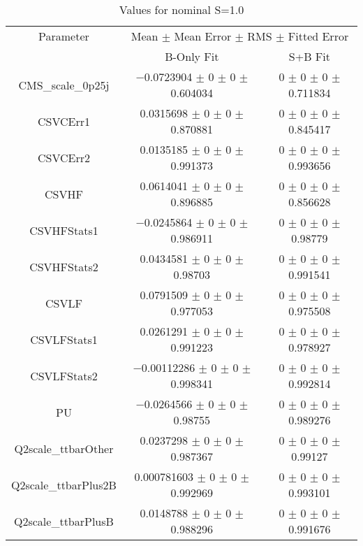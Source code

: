\begin{table}
\centering
\caption{Values for nominal S=1.0}
\begin{tabular}{ccc}
\toprule
Parameter & \multicolumn{2}{c}{Mean $\pm$ Mean Error $\pm$ RMS $\pm$ Fitted Error}\\
 & B-Only Fit & S+B Fit\\
\midrule
CMS\_scale\_0p25j & \num{-0.0723904} $\pm$ \num{0} $\pm$ \num{0} $\pm$ \num{0.604034} & \num{0} $\pm$ \num{0} $\pm$ \num{0} $\pm$ \num{0.711834}\\
CSVCErr1 & \num{0.0315698} $\pm$ \num{0} $\pm$ \num{0} $\pm$ \num{0.870881} & \num{0} $\pm$ \num{0} $\pm$ \num{0} $\pm$ \num{0.845417}\\
CSVCErr2 & \num{0.0135185} $\pm$ \num{0} $\pm$ \num{0} $\pm$ \num{0.991373} & \num{0} $\pm$ \num{0} $\pm$ \num{0} $\pm$ \num{0.993656}\\
CSVHF & \num{0.0614041} $\pm$ \num{0} $\pm$ \num{0} $\pm$ \num{0.896885} & \num{0} $\pm$ \num{0} $\pm$ \num{0} $\pm$ \num{0.856628}\\
CSVHFStats1 & \num{-0.0245864} $\pm$ \num{0} $\pm$ \num{0} $\pm$ \num{0.986911} & \num{0} $\pm$ \num{0} $\pm$ \num{0} $\pm$ \num{0.98779}\\
CSVHFStats2 & \num{0.0434581} $\pm$ \num{0} $\pm$ \num{0} $\pm$ \num{0.98703} & \num{0} $\pm$ \num{0} $\pm$ \num{0} $\pm$ \num{0.991541}\\
CSVLF & \num{0.0791509} $\pm$ \num{0} $\pm$ \num{0} $\pm$ \num{0.977053} & \num{0} $\pm$ \num{0} $\pm$ \num{0} $\pm$ \num{0.975508}\\
CSVLFStats1 & \num{0.0261291} $\pm$ \num{0} $\pm$ \num{0} $\pm$ \num{0.991223} & \num{0} $\pm$ \num{0} $\pm$ \num{0} $\pm$ \num{0.978927}\\
CSVLFStats2 & \num{-0.00112286} $\pm$ \num{0} $\pm$ \num{0} $\pm$ \num{0.998341} & \num{0} $\pm$ \num{0} $\pm$ \num{0} $\pm$ \num{0.992814}\\
PU & \num{-0.0264566} $\pm$ \num{0} $\pm$ \num{0} $\pm$ \num{0.98755} & \num{0} $\pm$ \num{0} $\pm$ \num{0} $\pm$ \num{0.989276}\\
Q2scale\_ttbarOther & \num{0.0237298} $\pm$ \num{0} $\pm$ \num{0} $\pm$ \num{0.987367} & \num{0} $\pm$ \num{0} $\pm$ \num{0} $\pm$ \num{0.99127}\\
Q2scale\_ttbarPlus2B & \num{0.000781603} $\pm$ \num{0} $\pm$ \num{0} $\pm$ \num{0.992969} & \num{0} $\pm$ \num{0} $\pm$ \num{0} $\pm$ \num{0.993101}\\
Q2scale\_ttbarPlusB & \num{0.0148788} $\pm$ \num{0} $\pm$ \num{0} $\pm$ \num{0.988296} & \num{0} $\pm$ \num{0} $\pm$ \num{0} $\pm$ \num{0.991676}\\

\end{tabular}
\end{table}
